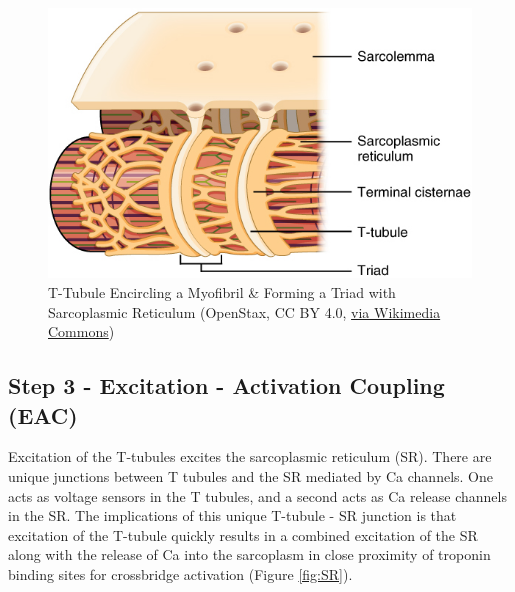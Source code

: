 \begin{figure}[!ht]
    \centering
    \includegraphics[width=1\linewidth]{./figure/T-tubule.jpg}
    \caption{T-Tubule Encircling a Myofibril \& Forming a Triad with Sarcoplasmic Reticulum  \footnotesize{(OpenStax, CC BY 4.0, \href{https://creativecommons.org/licenses/by/4.0}{via Wikimedia Commons})}}
    \label{fig:T-tubule}
\end{figure}

\subsection{Step 3 - Excitation - Activation Coupling (EAC)}
Excitation of the T-tubules excites the sarcoplasmic reticulum (SR). There are unique junctions between T tubules and the SR mediated by Ca channels. One acts as voltage sensors in the T tubules, and a second acts as Ca release channels in the SR.\footnotemark{} The implications of this unique T-tubule - SR junction is that excitation of the T-tubule quickly results in a combined excitation of the SR along with the release of Ca into the sarcoplasm\footnotemark{} in close proximity of troponin binding sites for crossbridge activation (Figure \ref{fig:SR}).

